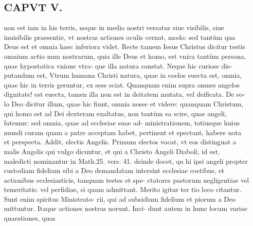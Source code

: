 \documentclass{article}
\begin{document}
\begin{pages}
\section*{CAPVT  V. }
\marginpar{[ p.3 ]}\pstart non est iam in his terris, neque in medio nostri versatur siue visibilis, siue inuisibilis praesentie, vt nostras actiones oculis cernat, modo: sed tantùm qua Deus est et omnia haec inferiora videt. Recte tamem Iesus Christus dicitur testis omnium actio num nostrarum, quia ille Deus et homo, est vnica tantùm persona, quae hypostatica vnione vtra- que illa natura constat. Neque hic curiose dis- putandum est, Vtrum humana Christi natura, quae in coelos euecta est, omnia, quae hic in terris geruntur, ex sese sciat. Quanquam enim supra omnes angelos dignitate! est euecta, tamen illa non est in deitatem mutata, vel deificata. De so- lo Deo dicitur illum, quae hic fiunt, omnia nosse et videre: quanquam Christum, qui homo est ad Dei dexteram exaltatus, non tantùm ea scire, quae angeli, fatemur: sed omnia, quae ad ecclesiae suae ad- ministrationem, totiusque  huius mundi curam quam a patre acceptam habet, pertinent et spectant, habere nota et perspecta.  \pend\pstart Addit, electis Angelis. Primum electos vocat, vt eos distinguat a malis Angelis qui vulgo dicuntur, et qui a Christo Angeli Diaboli, id est, maledicti nominantur in Math.25. vers. 41. deinde docet, qu hi ipsi angeli propter custodiam fidelium sibi a Deo demandatam intersint ecclesiae coetibus, et actionibus ecclesiasticis, tanquam testes et spe- ctatores pastorum negligentiae vel temeritatis: vel perfidiae, si quam admittant. Merito igitur ter tio loco citantur. Sunt enim spiritus Ministrato- rii, qui ad subsidium fidelium et piorum a Deo mittuntur. Itaque actiones nostras norunt. Inci- dunt autem in hunc locum variae quaestiones, quas  \pend

\end{pages}
\end{document}

